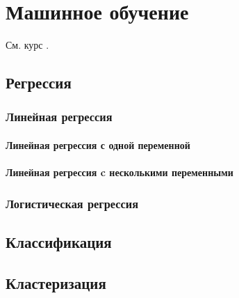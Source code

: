 \chapter{Машинное обучение}

См. курс \cite{coursera:machine-learning}.
\section{Регрессия}
\subsection{Линейная регрессия}
\subsubsection{Линейная регрессия с одной переменной}
\subsubsection{Линейная регрессия c несколькими переменными}
\subsection{Логистическая регрессия}
\section{Классификация}
\section{Кластеризация}
